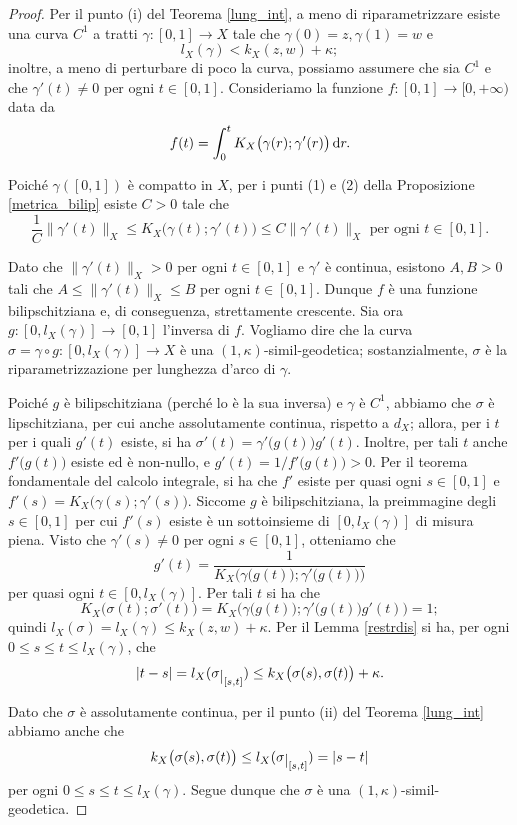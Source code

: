 \begin{proof}
    Per il punto (i) del Teorema \ref{lung_int}, a meno di riparametrizzare esiste una curva $C^1$ a tratti $\gamma:[0,1] \longrightarrow X$ tale che $\gamma(0)=z,\gamma(1)=w$ e
    $$l_X(\gamma)<k_X(z,w)+\kappa;$$
    inoltre, a meno di perturbare di poco la curva, possiamo assumere che sia $C^1$ e che $\gamma'(t)\not=0$ per ogni $t\in[0,1]$. Consideriamo la funzione $f:[0,1] \longrightarrow [0,+\infty)$ data da
    $$f(t)=\int_0^t K_X\big(\gamma(r);\gamma'(r)\big)\mathop{}\!\mathrm{d} r.$$

    Poiché $\gamma([0,1])$ è compatto in $X$, per i punti (1) e (2) della Proposizione \ref{metrica_bilip} esiste $C>0$ tale che
    $$\frac{1}{C}\|\gamma'(t)\|_X \le K_X\big(\gamma(t);\gamma'(t)\big) \le C\|\gamma'(t)\|_X\text{ per ogni }t\in[0,1].$$

    Dato che $\|\gamma'(t)\|_X>0$ per ogni $t\in[0,1]$ e $\gamma'$ è continua, esistono $A,B>0$ tali che $A \le \|\gamma'(t)\|_X\le B$ per ogni $t\in[0,1]$. Dunque $f$ è una funzione bilipschitziana e, di conseguenza, strettamente crescente. Sia ora $g:[0,l_X(\gamma)] \longrightarrow [0,1]$ l'inversa di $f$. Vogliamo dire che la curva $\sigma=\gamma\circ g:[0,l_X(\gamma)] \longrightarrow X$ è una $(1,\kappa)$-simil-geodetica; sostanzialmente, $\sigma$ è la riparametrizzazione per lunghezza d'arco di $\gamma$.

    Poiché $g$ è bilipschitziana (perché lo è la sua inversa) e $\gamma$ è $C^1$, abbiamo che $\sigma$ è lipschitziana, per cui anche assolutamente continua, rispetto a $d_X$; allora, per i $t$ per i quali $g'(t)$ esiste, si ha $\sigma'(t)=\gamma'\big(g(t)\big)g'(t)$. Inoltre, per tali $t$ anche $f'\big(g(t)\big)$ esiste ed è non-nullo, e $g'(t)=1/f'\big(g(t)\big)>0$. Per il teorema fondamentale del calcolo integrale, si ha che $f'$ esiste per quasi ogni $s\in[0,1]$ e $f'(s)=K_X\big(\gamma(s);\gamma'(s)\big)$. Siccome $g$ è bilipschitziana, la preimmagine degli $s\in[0,1]$ per cui $f'(s)$ esiste è un sottoinsieme di $[0,l_X(\gamma)]$ di misura piena. Visto che $\gamma'(s)\not=0$ per ogni $s\in[0,1]$, otteniamo che
    $$g'(t)=\frac{1}{K_X\Big(\gamma\big(g(t)\big);\gamma'\big(g(t)\big)\Big)}$$
    per quasi ogni $t\in[0,l_X(\gamma)]$. Per tali $t$ si ha che
    $$K_X\big(\sigma(t);\sigma'(t)\big)=K_X\Big(\gamma\big(g(t)\big);\gamma'\big(g(t)\big)g'(t)\Big)=1;$$
    quindi $l_X(\sigma)=l_X(\gamma) \le k_X(z,w)+\kappa$. Per il Lemma \ref{restrdis} si ha, per ogni $0 \le s \le t \le l_X(\gamma)$, che
    $$|t-s|=l_X(\sigma\restrict{[s,t]}) \le k_X\big(\sigma(s),\sigma(t)\big)+\kappa.$$

    Dato che $\sigma$ è assolutamente continua, per il punto (ii) del Teorema \ref{lung_int} abbiamo anche che
    $$k_X\big(\sigma(s),\sigma(t)\big) \le l_X(\sigma\restrict{[s,t]})=|s-t|$$
    per ogni $0 \le s \le t \le l_X(\gamma)$. Segue dunque che $\sigma$ è una $(1,\kappa)$-simil-geodetica.
\end{proof}

